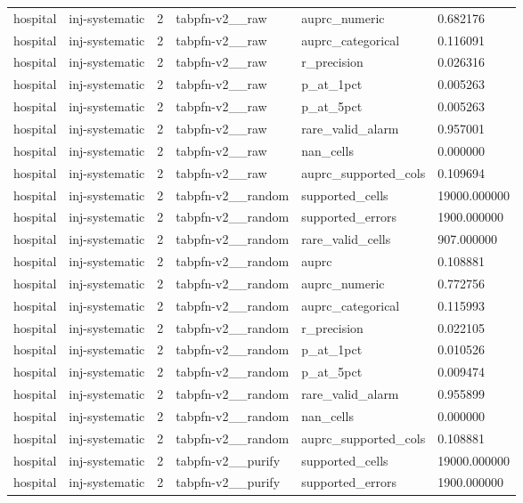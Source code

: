 \begin{tabular}{llllll}
hospital & inj-systematic & 2 & tabpfn-v2\_\_raw & auprc\_numeric & 0.682176 \\
hospital & inj-systematic & 2 & tabpfn-v2\_\_raw & auprc\_categorical & 0.116091 \\
hospital & inj-systematic & 2 & tabpfn-v2\_\_raw & r\_precision & 0.026316 \\
hospital & inj-systematic & 2 & tabpfn-v2\_\_raw & p\_at\_1pct & 0.005263 \\
hospital & inj-systematic & 2 & tabpfn-v2\_\_raw & p\_at\_5pct & 0.005263 \\
hospital & inj-systematic & 2 & tabpfn-v2\_\_raw & rare\_valid\_alarm & 0.957001 \\
hospital & inj-systematic & 2 & tabpfn-v2\_\_raw & nan\_cells & 0.000000 \\
hospital & inj-systematic & 2 & tabpfn-v2\_\_raw & auprc\_supported\_cols & 0.109694 \\
hospital & inj-systematic & 2 & tabpfn-v2\_\_random & supported\_cells & 19000.000000 \\
hospital & inj-systematic & 2 & tabpfn-v2\_\_random & supported\_errors & 1900.000000 \\
hospital & inj-systematic & 2 & tabpfn-v2\_\_random & rare\_valid\_cells & 907.000000 \\
hospital & inj-systematic & 2 & tabpfn-v2\_\_random & auprc & 0.108881 \\
hospital & inj-systematic & 2 & tabpfn-v2\_\_random & auprc\_numeric & 0.772756 \\
hospital & inj-systematic & 2 & tabpfn-v2\_\_random & auprc\_categorical & 0.115993 \\
hospital & inj-systematic & 2 & tabpfn-v2\_\_random & r\_precision & 0.022105 \\
hospital & inj-systematic & 2 & tabpfn-v2\_\_random & p\_at\_1pct & 0.010526 \\
hospital & inj-systematic & 2 & tabpfn-v2\_\_random & p\_at\_5pct & 0.009474 \\
hospital & inj-systematic & 2 & tabpfn-v2\_\_random & rare\_valid\_alarm & 0.955899 \\
hospital & inj-systematic & 2 & tabpfn-v2\_\_random & nan\_cells & 0.000000 \\
hospital & inj-systematic & 2 & tabpfn-v2\_\_random & auprc\_supported\_cols & 0.108881 \\
hospital & inj-systematic & 2 & tabpfn-v2\_\_purify & supported\_cells & 19000.000000 \\
hospital & inj-systematic & 2 & tabpfn-v2\_\_purify & supported\_errors & 1900.000000 \\

\end{tabular}
